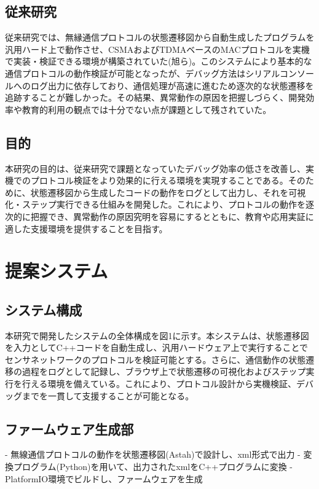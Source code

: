 \documentclass[paper]{ieicej}
\begin{document}
\subsection{従来研究}
従来研究では、無縁通信プロトコルの状態遷移図から自動生成したプログラムを汎用ハード上で動作させ、CSMAおよびTDMAベースのMACプロトコルを実機で実装・検証できる環境が構築されていた(旭ら)。このシステムにより基本的な通信プロトコルの動作検証が可能となったが、デバッグ方法はシリアルコンソールへのログ出力に依存しており、通信処理が高速に進むため逐次的な状態遷移を追跡することが難しかった。その結果、異常動作の原因を把握しづらく、開発効率や教育的利用の観点では十分でない点が課題として残されていた。
\subsection{目的}
本研究の目的は、従来研究で課題となっていたデバッグ効率の低さを改善し、実機でのプロトコル検証をより効果的に行える環境を実現することである。そのために、状態遷移図から生成したコードの動作をログとして出力し、それを可視化・ステップ実行できる仕組みを開発した。これにより、プロトコルの動作を逐次的に把握でき、異常動作の原因究明を容易にするとともに、教育や応用実証に適した支援環境を提供することを目指す。



\section{提案システム}
\subsection{システム構成}
本研究で開発したシステムの全体構成を図1に示す。本システムは、状態遷移図を入力としてC++コードを自動生成し、汎用ハードウェア上で実行することでセンサネットワークのプロトコルを検証可能とする。さらに、通信動作の状態遷移の過程をログとして記録し、ブラウザ上で状態遷移の可視化およびステップ実行を行える環境を備えている。これにより、プロトコル設計から実機検証、デバッグまでを一貫して支援することが可能となる。
\subsection{ファームウェア生成部}
- 無線通信プロトコルの動作を状態遷移図(Astah)で設計し、xml形式で出力
- 変換プログラム(Python)を用いて、出力されたxmlをC++プログラムに変換
- PlatformIO環境でビルドし、ファームウェアを生成
\end{document}
